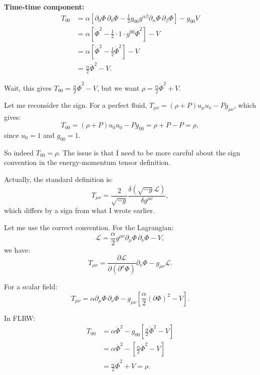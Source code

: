 \documentclass[11pt,a4paper]{article}
\numberwithin{equation}{section}
\theoremstyle{plain}
\theoremstyle{definition}
\theoremstyle{remark}
\begin{document}
\textbf{Time-time component:}
\begin{align}
T_{00} &= \alpha\left[\partial_0\Phi\,\partial_0\Phi - \frac{1}{2}g_{00}g^{\alpha\beta}\partial_\alpha\Phi\,\partial_\beta\Phi\right] - g_{00}V\\
&= \alpha\left[\dot{\Phi}^2 - \frac{1}{2}\cdot 1\cdot g^{00}\dot{\Phi}^2\right] - V\\
&= \alpha\left[\dot{\Phi}^2 - \frac{1}{2}\dot{\Phi}^2\right] - V\\
&= \frac{\alpha}{2}\dot{\Phi}^2 - V.
\end{align}

Wait, this gives $T_{00} = \frac{\alpha}{2}\dot{\Phi}^2 - V$, but we want $\rho = \frac{\alpha}{2}\dot{\Phi}^2 + V$.

Let me reconsider the sign. For a perfect fluid, $T_{\mu\nu} = (\rho + P)u_\mu u_\nu - Pg_{\mu\nu}$, which gives:
\begin{equation}
T_{00} = (\rho + P)u_0 u_0 - Pg_{00} = \rho + P - P = \rho,
\end{equation}
since $u_0 = 1$ and $g_{00} = 1$.

So indeed $T_{00} = \rho$. The issue is that I need to be more careful about the sign convention in the energy-momentum tensor definition.

Actually, the standard definition is:
\begin{equation}
T_{\mu\nu} = \frac{2}{\sqrt{-g}}\frac{\delta(\sqrt{-g}\mathcal{L})}{\delta g^{\mu\nu}},
\end{equation}
which differs by a sign from what I wrote earlier.

Let me use the correct convention. For the Lagrangian:
\begin{equation}
\mathcal{L} = \frac{\alpha}{2}g^{\mu\nu}\partial_\mu\Phi\,\partial_\nu\Phi - V,
\end{equation}
we have:
\begin{equation}
T_{\mu\nu} = \frac{\partial\mathcal{L}}{\partial(\partial^\mu\Phi)}\partial_\nu\Phi - g_{\mu\nu}\mathcal{L}.
\end{equation}

For a scalar field:
\begin{equation}
T_{\mu\nu} = \alpha\partial_\mu\Phi\,\partial_\nu\Phi - g_{\mu\nu}\left[\frac{\alpha}{2}(\partial\Phi)^2 - V\right].
\end{equation}

In FLRW:
\begin{align}
T_{00} &= \alpha\dot{\Phi}^2 - g_{00}\left[\frac{\alpha}{2}\dot{\Phi}^2 - V\right]\\
&= \alpha\dot{\Phi}^2 - \left[\frac{\alpha}{2}\dot{\Phi}^2 - V\right]\\
&= \frac{\alpha}{2}\dot{\Phi}^2 + V = \rho.
\end{align}
\end{document}
